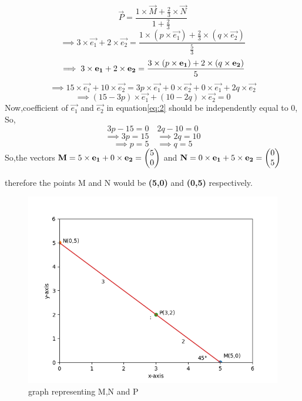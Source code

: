 \documentclass[journal,12pt,twocolumn]{IEEEtran}
\begin{document}
\begin{equation*}
    \vec{P}=\frac{1\times \vec{M}+\frac{2}{3}\times \vec{N}}{1+\frac{2}{3}}
\end{equation*}
\begin{equation*}
    \implies3\times\vec{e_1}+2\times\vec{e_2}=\frac{1\times (p\times \vec{e_1})+\frac{2}{3}\times (q\times\vec{e_2})}{\frac{5}{3}}
\end{equation*}
\begin{equation*}
  \small \implies3\times\vec{e_1}+2\times\vec{e_2}=\frac{3\times (p\times\vec{e_1})+2\times (q\times\vec{e_2})}{5}
\end{equation*}
\begin{equation*}
  \implies 15\times\vec{e_1}+10\times\vec{e_2}=3p\times\vec{e_1}+0\times\vec{e_2}+0\times\vec{e_1}+2q\times\vec{e_2}
\end{equation*}
\begin{equation}
\label{eq:2}
 \implies (15-3p)\times \vec{e_1}+(10-2q)\times\vec{e_2}=0
\end{equation}
Now,coefficient of $\vec{e_1}$ and $\vec{e_2}$ in equation\eqref{eq:2} should be independently equal to 0,
So,
\begin{equation*}
3p-15=0\quad 2q-10=0
\end{equation*}
\begin{equation*}
 \implies3p=15\quad  \implies2q=10
\end{equation*}
\begin{equation}
 \implies p=5\quad \implies q=5      
\end{equation}
So,the vectors $\vec{M}=5\times\vec{e_1}+0\times\vec{e_2}=\myvec{5\\0}$ and $ \vec{N}=0\times\vec{e_1}+5\times\vec{e_2}=\myvec{0\\5}$ 
 
therefore the points M and N would be \textbf{(5,0)} and \textbf{(0,5)} respectively.
\begin{figure}[htb!]
\centering
\includegraphics[width = \columnwidth]{figures/Figure_1.png}
\caption{graph representing M,N and P}
\end{figure}
\end{document}
